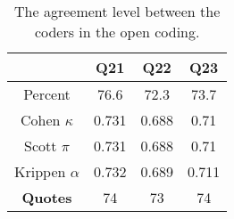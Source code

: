 \begin{table}[t]
\caption{The agreement level between the coders in the open
coding.}
\label{table: agreement level}
\centering
\begin{tabular}{cccc}
\hline
                & \textbf{Q21} & \textbf{Q22} & \textbf{Q23} \\ \hline
Percent         & 76.6         & 72.3         & 73.7         \\ \hline
Cohen   $\kappa$        & 0.731        & 0.688        & 0.71         \\ \hline
Scott  $\pi$         & 0.731        & 0.688        & 0.71         \\ \hline
Krippen  $\alpha$       & 0.732        & 0.689        & 0.711        \\ \hline
\textbf{Quotes} & 74          & 73          & 74          \\ \hline
\end{tabular}
\end{table}